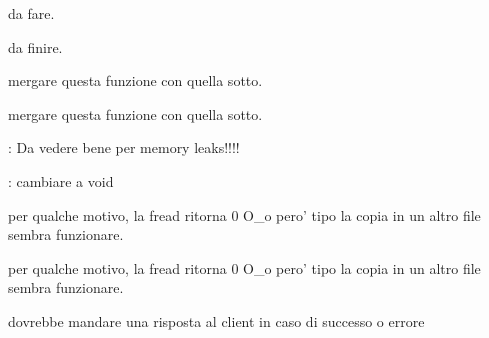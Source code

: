 
\begin{DoxyRefList}
\item[\label{todo__todo000011}%
\hypertarget{todo__todo000011}{}%
Globale \hyperlink{StruttureDati_8c_a1b93a1e03b27ca80768a152cebb0fed3}{close\+Opened\+File} (unsigned long int ptid)]da fare.  
\item[\label{todo__todo000012}%
\hypertarget{todo__todo000012}{}%
Globale \hyperlink{StruttureDati_8c_a1674324a5bfcb0d5c3a5547c23a73e5a}{free\+Opened\+File} (\hyperlink{structOpenedFile}{Opened\+File} $\ast$id)]da finire.  
\item[\label{todo__todo000005}%
\hypertarget{todo__todo000005}{}%
Globale \hyperlink{CommandsHandler_8h_a919c7f4b4bcb820f1d6566238178390e}{get\+Command\+I\+D} (char $\ast$)]mergare questa funzione con quella sotto.  
\item[\label{todo__todo000005}%
\hypertarget{todo__todo000005}{}%
Globale \hyperlink{CommandsHandler_8h_a919c7f4b4bcb820f1d6566238178390e}{get\+Command\+I\+D} (char $\ast$)]mergare questa funzione con quella sotto.  
\item[\label{todo__todo000008}%
\hypertarget{todo__todo000008}{}%
Globale \hyperlink{OPE_8c_a6eccb6ec6ec9c8375e70ab4088b511a5}{handle\+Open\+Command} (char $\ast$command, int socket)]\+: Da vedere bene per memory leaks!!!!  
\item[\label{todo__todo000004}%
\hypertarget{todo__todo000004}{}%
Globale \hyperlink{Server_2CLOSE_8c_a29faf0797a0c5b3d36a86e72cc023d85}{handle\+Writes} (int number\+Of\+Changes, \hyperlink{structOpenedFile}{Opened\+File} $\ast$id)]\+: cambiare a void  
\item[\label{todo__todo000002}%
\hypertarget{todo__todo000002}{}%
Globale \hyperlink{Client_2READ_8c_aa4b63039ca9686f5666ce6bbb33317d7}{mydfs\+\_\+read} (\hyperlink{structMyDFSId}{My\+D\+F\+S\+Id} $\ast$id, int pos, void $\ast$ptr, unsigned int size)]per qualche motivo, la fread ritorna 0 O\+\_\+o pero' tipo la copia in un altro file sembra funzionare.  
\item[\label{todo__todo000002}%
\hypertarget{todo__todo000002}{}%
Globale \hyperlink{Client_2READ_8c_aa4b63039ca9686f5666ce6bbb33317d7}{mydfs\+\_\+read} (\hyperlink{structMyDFSId}{My\+D\+F\+S\+Id} $\ast$id, int pos, void $\ast$ptr, unsigned int size)]per qualche motivo, la fread ritorna 0 O\+\_\+o pero' tipo la copia in un altro file sembra funzionare.  
\item[\label{todo__todo000007}%
\hypertarget{todo__todo000007}{}%
File \hyperlink{OPE_8c}{O\+P\+E.c} ]dovrebbe mandare una risposta al client in caso di successo o errore 


\end{DoxyRefList}
